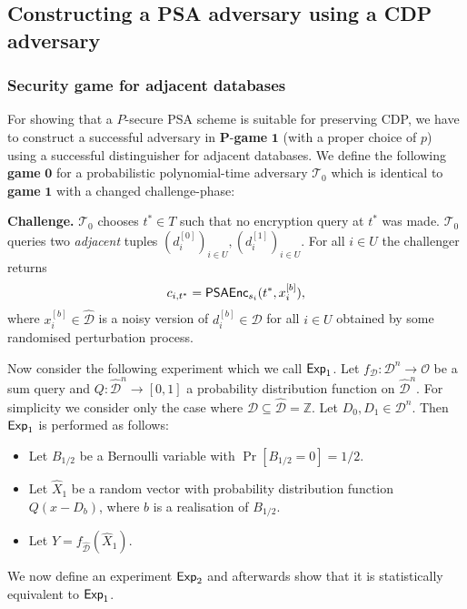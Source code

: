 \documentclass[10pt]{extarticle}
\begin{document}
\subsection{Constructing a PSA adversary using a CDP adversary}

\subsubsection{Security game for adjacent databases}
For showing that a $P$-secure PSA scheme is suitable for preserving {\upshape\sffamily CDP}, we have to construct a successful adversary in $\boldsymbol P$-\textbf{game} $\boldsymbol 1$ (with a proper choice of $p$) using a successful distinguisher for adjacent databases. We define the following \textbf{game} $\boldsymbol 0$ for a probabilistic polynomial-time adversary $\mathcal{T}_0$ which is identical to \textbf{game} $\boldsymbol 1$ with a changed challenge-phase:
\begin{description}
\item\textbf{Challenge.} $\mathcal{T}_0$ chooses $t^*\in T$ such that no encryption query at $t^*$ was made. $\mathcal{T}_0$ queries two \textit{adjacent} tuples $(d_i^{[0]})_{i\in U},(d_i^{[1]})_{i\in U}$. For all $i\in U$ the challenger returns 
\[c_{i,t^*}=\mbox{\upshape\sffamily PSAEnc}_{s_i}(t^*,x_i^{[b]}),\]
where $x_i^{[b]}\in\widehat{\mathcal{D}}$ is a noisy version of $d_i^{[b]}\in\mathcal{D}$ for all $i\in U$ obtained by some randomised perturbation process.
\end{description}
Now consider the following experiment which we call $\mbox{\upshape \sffamily Exp}_1$. Let $f_{\mathcal{D}}:\mathcal{D}^n\to\mathcal{O}$ be a sum query and $Q:\widehat{\mathcal{D}}^n\to[0,1]$ a probability distribution function on $\widehat{\mathcal{D}}^n$. For simplicity we consider only the case where $\mathcal{D}\subseteq\widehat{\mathcal{D}}=\mathbb{Z}$. Let $D_0,D_1\in\mathcal{D}^n$. Then $\mbox{\upshape \sffamily Exp}_1$ is performed as follows:
\begin{itemize} 
\item Let $B_{1/2}$ be a Bernoulli variable with $\Pr[B_{1/2}=0]=1/2$.
\item Let $\widehat{X}_1$ be a random vector with probability distribution function $Q(x-D_b)$, where $b$ is a realisation of $B_{1/2}$.
\item Let $Y=f_{\widehat{\mathcal{D}}}(\widehat{X}_1)$.
\end{itemize}
We now define an experiment $\mbox{\upshape \sffamily Exp}_2$ and afterwards show that it is statistically equivalent to $\mbox{\upshape \sffamily Exp}_1$.
\end{document}
